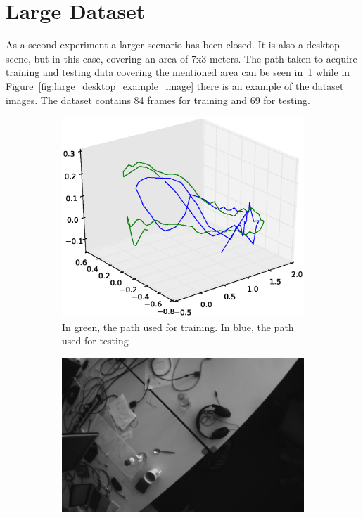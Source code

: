 \section{Large Dataset}
\label{sec:large_dataset}

As a second experiment a larger scenario has been closed. It is also a desktop scene, but in this case, covering an area of 7x3 meters. The path taken to acquire training and testing data covering the mentioned area can be seen in~\ref{fig:large_desktop_train_test} while in Figure~\ref{fig:large_desktop_example_image} there is an example of the dataset images. The dataset contains 84 frames for training and 69 for testing.\\

\begin{figure}[htpb]
  \begin{subfigure}[b]{6cm}
          \includegraphics[width=\linewidth]{img/large_desktop/test_train_path.eps}
          \caption{In green, the path used for training. In blue, the path used for testing}
          \label{fig:large_desktop_train_test}
  \end{subfigure}   
  \qquad
  \begin{subfigure}[b]{5cm}
         \includegraphics[width=\linewidth]{img/large_desktop/image00778.png}

\end{subfigure}
\end{figure}
